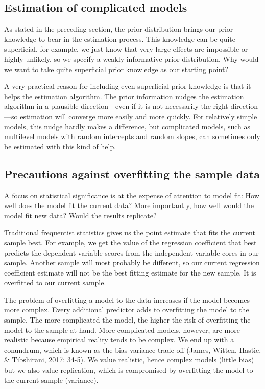 \documentclass[
  english,
  doc]{apa6}
\begin{document}
\hypertarget{estimation-of-complicated-models}{%
\subsection{Estimation of complicated models}\label{estimation-of-complicated-models}}

As stated in the preceding section, the prior distribution brings our prior knowledge to bear in the estimation process. This knowledge can be quite superficial, for example, we just know that very large effects are impossible or highly unlikely, so we specify a weakly informative prior distribution. Why would we want to take quite superficial prior knowledge as our starting point?

A very practical reason for including even superficial prior knowledge is that it helps the estimation algorithm. The prior information nudges the estimation algorithm in a plausible direction---even if it is not necessarily the right direction---so estimation will converge more easily and more quickly. For relatively simple models, this nudge hardly makes a difference, but complicated models, such as multilevel models with random intercepts and random slopes, can sometimes only be estimated with this kind of help.

\hypertarget{precautions-against-overfitting-the-sample-data}{%
\subsection{Precautions against overfitting the sample data}\label{precautions-against-overfitting-the-sample-data}}

A focus on statistical significance is at the expense of attention to model fit: How well does the model fit the current data? More importantly, how well would the model fit new data? Would the results replicate?

Traditional frequentist statistics gives us the point estimate that fits the current sample best. For example, we get the value of the regression coefficient that best predicts the dependent variable scores from the independent variable cores in our sample. Another sample will most probably be different, so our current regression coefficient estimate will not be the best fitting estimate for the new sample. It is overfitted to our current sample.

The problem of overfitting a model to the data increases if the model becomes more complex. Every additional predictor adds to overfitting the model to the sample. The more complicated the model, the higher the risk of overfitting the model to the sample at hand. More complicated models, however, are more realistic because empirical reality tends to be complex. We end up with a conundrum, which is known as the bias-variance trade-off (James, Witten, Hastie, \& Tibshirani, \protect\hyperlink{ref-JamesIntroductionStatisticalLearning2017}{2017}: 34-5). We value realistic, hence complex models (little bias) but we also value replication, which is compromised by overfitting the model to the current sample (variance).
\end{document}
